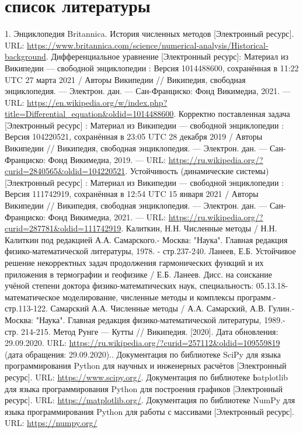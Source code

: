 \documentclass[a4paper,14pt]{article}
\begin{document}
\section{список литературы}
1. Энциклопедия Britannica. История численных методов [Электронный ресурс]. URL: \url{https://www.britannica.com/science/numerical-analysis/Historical-background}. Дифференциальное уравнение [Электронный ресурс]: Материал из Википедии — свободной энциклопедии : Версия 1014488600, сохранённая в 11:22 UTC 27 марта 2021 / Авторы Википедии // Википедия, свободная энциклопедия. — Электрон. дан. — Сан-Франциско: Фонд Викимедиа, 2021. — URL: \url{https://en.wikipedia.org/w/index.php?title=Differential_equation&oldid=1014488600}. Корректно поставленная задача [Электронный ресурс] : Материал из Википедии — свободной энциклопедии : Версия 104220521, сохранённая в 23:05 UTC 28 декабря 2019 / Авторы Википедии // Википедия, свободная энциклопедия. — Электрон. дан. — Сан-Франциско: Фонд Викимедиа, 2019. — URL: \url{https://ru.wikipedia.org/?curid=2840565&oldid=104220521}. Устойчивость (динамические системы) [Электронный ресурс] : Материал из Википедии — свободной энциклопедии : Версия 111742919, сохранённая в 12:54 UTC 15 января 2021 / Авторы Википедии // Википедия, свободная энциклопедия. — Электрон. дан. — Сан-Франциско: Фонд Викимедиа, 2021. — URL: \url{https://ru.wikipedia.org/?curid=287781&oldid=111742919}. Калиткин, Н.Н. Численные методы / Н.Н. Калиткин под редакцией А.А. Самарского.- Москва: "Наука". Главная редакция физико-математической литературы, 1978. - стр.237-240. Ланеев, Е.Б. Устойчивое решение некорректных задач продолжения гармонических функций и их приложения в термографии и геофизике / Е.Б. Ланеев. Дисс. на соискание учёной степени доктора физико-математических наук, специальность: 05.13.18-математическое моделирование, численные методы и комплексы программ.- стр.113-122. Самарский А.А. Численные методы / А.А. Самарский, А.В. Гулин.- Москва: "Наука". Главная редакция физико-математической литературы, 1989.- стр. 214-215. Метод Рунге — Кутты // Википедия. [2020]. Дата обновления: 29.09.2020. URL: \url{https://ru.wikipedia.org/?curid=257112&oldid=109559819} (дата обращения: 29.09.2020).. Документация по библиотеке SciPy для языка программирования Python для научных и инженерных расчётов [Электронный ресурс]. URL: \url{https://www.scipy.org/}. Документация по библиотеке Ьatplotlib для языка программирования Python для построения графиков [Электронный ресурс]. URL: \url{https://matplotlib.org/}. Документация по библиотеке NumPy для языка программирования Python для работы с массивами [Электронный ресурс]. URL: \url{https://numpy.org/}\newline
\end{document}
